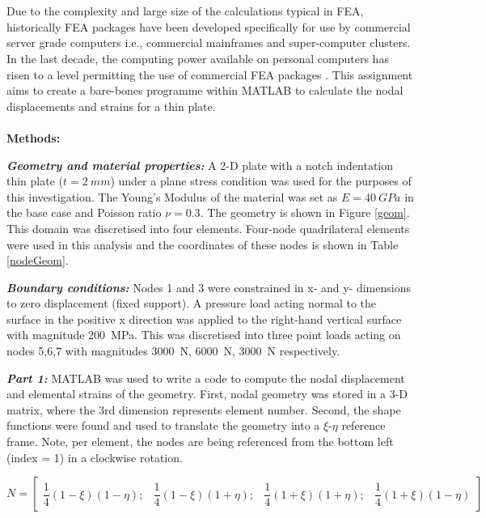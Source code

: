 \documentclass[11pt]{article}
\begin{document}
\\
\\
Due to the complexity and large size of the calculations typical in FEA, historically FEA packages have been developed specifically for use by commercial server grade computers i.e., commercial mainframes and super-computer clusters. In the last decade, the computing power available on personal computers has risen to a level permitting the use of commercial FEA packages \cite{AKIN198619}. This assignment aims to create a bare-bones programme within MATLAB to calculate the nodal displacements and strains for a thin plate.
\\
\\
\textbf{Methods:}

\textbf{\textit{Geometry and material properties:}} A 2-D plate with a notch indentation thin plate ($t = \SI{2}{mm}$) under a plane stress condition was used for the purposes of this investigation. The Young's Modulus of the material was set as $E=\SI{40}{GPa}$ in the base case and Poisson ratio $\nu = 0.3$. The geometry is shown in Figure \ref{geom}. This domain was discretised into four elements. Four-node quadrilateral elements were used in this analysis and the coordinates of these nodes is shown in Table \ref{nodeGeom}.

\textbf{\textit{Boundary conditions:}} Nodes 1 and 3 were constrained in x- and y- dimensions to zero displacement (fixed support). A pressure load acting normal to the surface in the positive x direction was applied to the right-hand vertical surface with magnitude \SI{200}{MPa}. This was discretised into three point loads acting on nodes 5,6,7 with magnitudes \SI{3000}{\newton}, \SI{6000}{\newton}, \SI{3000}{\newton} respectively.

\textbf{\textit{Part 1:}} MATLAB was used to write a code to compute the nodal displacement and elemental strains of the geometry. First, nodal geometry was stored in a 3-D matrix, where the 3rd dimension represents element number. Second, the shape functions were found and used to translate the geometry into a $\xi$-$\eta$ reference frame. Note, per element, the nodes are being referenced from the bottom left (index = 1) in a clockwise rotation.

\begin{equation}
    N = \begin{bmatrix}
        \dfrac{1}{4}\left(1-\xi\right)\left(1-\eta\right); &
        \dfrac{1}{4}\left(1-\xi\right)\left(1+\eta\right); &
        \dfrac{1}{4}\left(1+\xi\right)\left(1+\eta\right); &
        \dfrac{1}{4}\left(1+\xi\right)\left(1-\eta\right)
    \end{bmatrix}
\end{equation}
\end{document}
